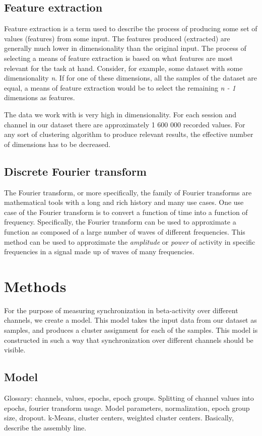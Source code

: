 \documentclass{article}
\begin{document}
\subsection{Feature extraction}
Feature extraction is a term used to describe the process of producing some set of values (features) from some input. The features produced (extracted) are generally much lower in dimensionality than the original input. The process of selecting a means of feature extraction is based on what features are most relevant for the task at hand. Consider, for example, some dataset with some dimensionality \textit{n}. If for one of these dimensions, all the samples of the dataset are equal, a means of feature extraction would be to select the remaining \textit{n - 1} dimensions as features.

The data we work with is very high in dimensionality. For each session and channel in our dataset there are approximately 1 600 000 recorded values. For any sort of clustering algorithm to produce relevant results, the effective number of dimensions has to be decreased. 

\subsection{Discrete Fourier transform}
The Fourier transform, or more specifically, the family of Fourier transforms are mathematical tools with a long and rich history and many use cases. One use case of the Fourier transform is to convert a function of time into a function of frequency. Specifically, the Fourier transform can be used to approximate a function as composed of a large number of waves of different frequencies. \citep{Fourier} This method can be used to approximate the \textit{amplitude} or \textit{power} of activity in specific frequencies in a signal made up of waves of many frequencies.

\newpage
\section{Methods}
For the purpose of measuring synchronization in beta-activity over different channels, we create a model. This model takes the input data from our dataset as samples, and produces a cluster assignment for each of the samples. This model is constructed in such a way that synchronization over different channels should be visible.

\subsection{Model}
Glossary: channels, values, epochs, epoch groups.
Splitting of channel values into epochs, fourier transform usage.
Model parameters, normalization, epoch group size, dropout.
k-Means, cluster centers, weighted cluster centers.
Basically, describe the assembly line.
\end{document}
